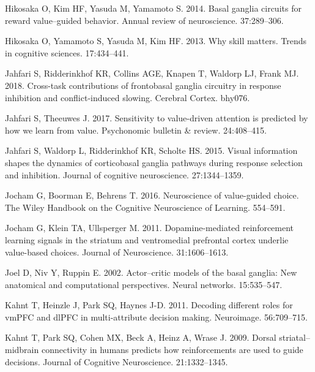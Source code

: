 \documentclass[]{article}
\begin{document}
\leavevmode\hypertarget{ref-Hikosakaetal2014}{}%
Hikosaka O, Kim HF, Yasuda M, Yamamoto S. 2014. Basal ganglia circuits
for reward value--guided behavior. Annual review of neuroscience.
37:289--306.

\leavevmode\hypertarget{ref-Hikosakaetal2013}{}%
Hikosaka O, Yamamoto S, Yasuda M, Kim HF. 2013. Why skill matters.
Trends in cognitive sciences. 17:434--441.

\leavevmode\hypertarget{ref-Jahfarietal2018}{}%
Jahfari S, Ridderinkhof KR, Collins AGE, Knapen T, Waldorp LJ, Frank MJ.
2018. Cross-task contributions of frontobasal ganglia circuitry in
response inhibition and conflict-induced slowing. Cerebral Cortex.
bhy076.

\leavevmode\hypertarget{ref-JahfariTheeuwes2017}{}%
Jahfari S, Theeuwes J. 2017. Sensitivity to value-driven attention is
predicted by how we learn from value. Psychonomic bulletin \& review.
24:408--415.

\leavevmode\hypertarget{ref-Jahfarietal2015}{}%
Jahfari S, Waldorp L, Ridderinkhof KR, Scholte HS. 2015. Visual
information shapes the dynamics of corticobasal ganglia pathways during
response selection and inhibition. Journal of cognitive neuroscience.
27:1344--1359.

\leavevmode\hypertarget{ref-Jochametal2016}{}%
Jocham G, Boorman E, Behrens T. 2016. Neuroscience of value-guided
choice. The Wiley Handbook on the Cognitive Neuroscience of Learning.
554--591.

\leavevmode\hypertarget{ref-Jochametal2011}{}%
Jocham G, Klein TA, Ullsperger M. 2011. Dopamine-mediated reinforcement
learning signals in the striatum and ventromedial prefrontal cortex
underlie value-based choices. Journal of Neuroscience. 31:1606--1613.

\leavevmode\hypertarget{ref-Joeletal2002}{}%
Joel D, Niv Y, Ruppin E. 2002. Actor--critic models of the basal
ganglia: New anatomical and computational perspectives. Neural networks.
15:535--547.

\leavevmode\hypertarget{ref-Kahntetal2011}{}%
Kahnt T, Heinzle J, Park SQ, Haynes J-D. 2011. Decoding different roles
for vmPFC and dlPFC in multi-attribute decision making. Neuroimage.
56:709--715.

\leavevmode\hypertarget{ref-Kahntetal2009}{}%
Kahnt T, Park SQ, Cohen MX, Beck A, Heinz A, Wrase J. 2009. Dorsal
striatal--midbrain connectivity in humans predicts how reinforcements
are used to guide decisions. Journal of Cognitive Neuroscience.
21:1332--1345.
\end{document}

